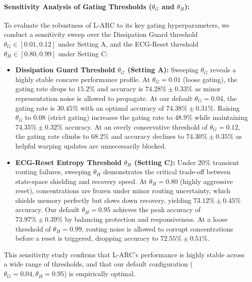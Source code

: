 \paragraph{Sensitivity Analysis of Gating Thresholds ($\theta_G$ and $\theta_H$):}
To evaluate the robustness of L-ARC to its key gating hyperparameters, we conduct a sensitivity sweep over the Dissipation Guard threshold $\theta_G \in [0.01, 0.12]$ under Setting A, and the ECG-Reset threshold $\theta_H \in [0.80, 0.99]$ under Setting C:
\begin{itemize}
    \item \textbf{Dissipation Guard Threshold $\theta_G$ (Setting A):} Sweeping $\theta_G$ reveals a highly stable concave performance profile. At $\theta_G = 0.01$ (loose gating), the gating rate drops to $15.2\%$ and accuracy is $74.28\% \pm 0.33\%$ as minor representation noise is allowed to propagate. At our default $\theta_G = 0.04$, the gating rate is $30.45\%$ with an optimal accuracy of $74.38\% \pm 0.31\%$. Raising $\theta_G$ to $0.08$ (strict gating) increases the gating rate to $48.9\%$ while maintaining $74.35\% \pm 0.32\%$ accuracy. At an overly conservative threshold of $\theta_G = 0.12$, the gating rate climbs to $68.2\%$ and accuracy declines to $74.30\% \pm 0.35\%$ as helpful warping updates are unnecessarily blocked.
    \item \textbf{ECG-Reset Entropy Threshold $\theta_H$ (Setting C):} Under $20\%$ transient routing failures, sweeping $\theta_H$ demonstrates the critical trade-off between state-space shielding and recovery speed. At $\theta_H = 0.80$ (highly aggressive reset), concentrations are frozen under minor routing uncertainty, which shields memory perfectly but slows down recovery, yielding $73.12\% \pm 0.45\%$ accuracy. Our default $\theta_H = 0.95$ achieves the peak accuracy of $73.97\% \pm 0.39\%$ by balancing protection and responsiveness. At a loose threshold of $\theta_H = 0.99$, routing noise is allowed to corrupt concentrations before a reset is triggered, dropping accuracy to $72.55\% \pm 0.51\%$.
\end{itemize}
This sensitivity study confirms that L-ARC's performance is highly stable across a wide range of thresholds, and that our default configuration ($\theta_G = 0.04, \theta_H = 0.95$) is empirically optimal.

